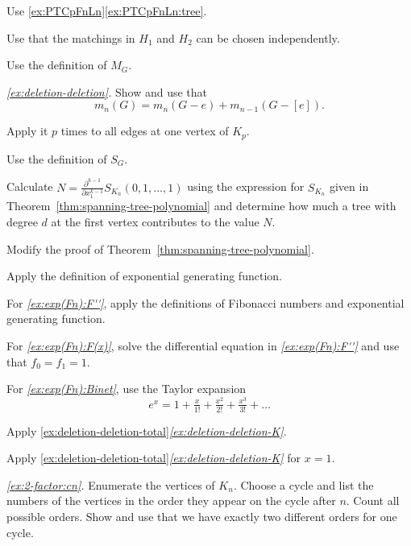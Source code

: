  Use \ref{ex:PTCpFnLn}\ref{ex:PTCpFnLn:tree}.

 Use that the matchings in $H_1$ and $H_2$ can be chosen independently.

 Use the definition of $M_G$.

\parbf{\ref{ex:deletion-deletion-total};}
\textit{\ref{ex:deletion-deletion}.}
Show and use that 
$$m_n(G)=m_n(G-e)+m_{n-1}(G-[e]).$$

Apply it $p$ times to all edges at one vertex of $K_p$.

 Use the definition of $S_G$.

Calculate $N=\tfrac{\partial^{k-1} }{\partial x_1^{k-1}}S_{K_n}(0,1,\dots,1)$ using the expression for $S_{K_n}$ given in Theorem~\ref{thm:spanning-tree-polynomial} and determine how much a tree with degree $d$ at the first vertex contributes to the value $N$.

Modify the proof of Theorem~\ref{thm:spanning-tree-polynomial}.

\setcounter{eqtn}{0}

 Apply the definition of exponential generating function.

For \textit{\ref{ex:exp(Fn):F''}},
apply the definitions of Fibonacci numbers and exponential generating function.

For \textit{\ref{ex:exp(Fn):F(x)}}, solve the differential equation in \textit{\ref{ex:exp(Fn):F''}} and use that $f_0=f_1=1$.

For \textit{\ref{ex:exp(Fn):Binet}}, use the Taylor expansion 
\[e^x=1+\tfrac x{1!}+\tfrac {x^2}{2!}+\tfrac {x^3}{3!}+\dots\]

Apply \ref{ex:deletion-deletion-total}\textit{\ref{ex:deletion-deletion-K}}.

Apply \ref{ex:deletion-deletion-total}\textit{\ref{ex:deletion-deletion-K}} for $x=1$.

\parbf{\ref{ex:ex:2-factor};} \textit{\ref{ex:2-factor:cn}.}
Enumerate the vertices of $K_n$.
Choose a cycle and list the numbers of the vertices in the order they appear on the cycle after $n$.
Count all possible orders.
Show and use that we have exactly two different orders for one cycle.

\setcounter{eqtn}{0}

